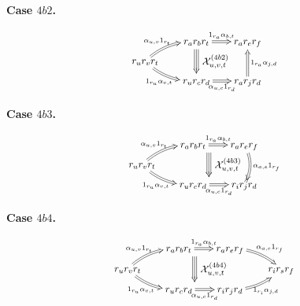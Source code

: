 \documentclass[a4paper, twoside, 11pt, english]{article}
\newcommand{\caseconfluence}[1]{%
\[
\scalebox{0.9}{$#1$}
\]
}
\begin{document}
\medskip

\noindent
\begin{minipage}[t]{0.49\textwidth}
\centering
\textbf{Case $4b2$.}

\caseconfluence{
\xymatrix @R=0.75em @C=1.8em @!C {
        & r_a r_b r_t
        \ar@2[r]^-{1_{r_a}\alpha_{b,t}}
        \ar@3[]!<0pt,-8pt>;[dd]!<0pt,8pt>
          ^-*+{\mathcal X^{(4b2)}_{u,v,t}}
        & r_a r_e r_f
        \\
r_u r_v r_t
        \ar@2@/^/[ur]^-{\alpha_{u,v}1_{r_t}}
        \ar@2@/_/[dr]_-{1_{r_u}\alpha_{v,t}}
        \\
        & r_u r_c r_d
        \ar@2[r]_-{\alpha_{u,c}1_{r_d}}
        & r_a r_j r_d
        \ar@2[uu]_-{1_{r_a}\alpha_{j,d}}
}
}
\end{minipage}
\hfill
\begin{minipage}[t]{0.49\textwidth}
\centering
\textbf{Case $4b3$.}

\caseconfluence{
\xymatrix @R=0.75em @C=1.8em @!C {
        & r_a r_b r_t
        \ar@2[r]^-{1_{r_a}\alpha_{b,t}}
        \ar@3[]!<16pt,-8pt>;[dd]!<16pt,8pt>
          ^-*+{\mathcal X^{(4b3)}_{u,v,t}}
        & r_a r_e r_f
        \ar@2@/^/[dd]^-{\alpha_{a,e}1_{r_f}}
        \\
r_u r_v r_t
        \ar@2@/^/[ur]^-{\alpha_{u,v}1_{r_t}}
        \ar@2@/_/[dr]_-{1_{r_u}\alpha_{v,t}}
        \\
        & r_u r_c r_d
        \ar@2[r]_-{\alpha_{u,c}1_{r_d}}
        & r_i r_j r_d
}
}
\end{minipage}

\medskip

\noindent
\begin{minipage}[t]{\textwidth}
\centering
\textbf{Case $4b4$.}

\caseconfluence{
\xymatrix @R=0.75em @C=1.8em @!C {
        & r_a r_b r_t
        \ar@2[r]^-{1_{r_a}\alpha_{b,t}}
        \ar@3[]!<16pt,-8pt>;[dd]!<16pt,8pt>
          ^-*+{\mathcal X^{(4b4)}_{u,v,t}}
        & r_a r_e r_f
        \ar@2@/^/[dr]^-{\alpha_{a,e}1_{r_f}}
        \\
r_u r_v r_t
        \ar@2@/^/[ur]^-{\alpha_{u,v}1_{r_t}}
        \ar@2@/_/[dr]_-{1_{r_u}\alpha_{v,t}}
        &&& r_i r_s r_f
        \\
        & r_u r_c r_d
        \ar@2[r]_-{\alpha_{u,c}1_{r_d}}
        & r_i r_j r_d
        \ar@2@/_/[ur]_-{1_{r_i}\alpha_{j,d}}
}
}
\end{minipage}
\end{document}
